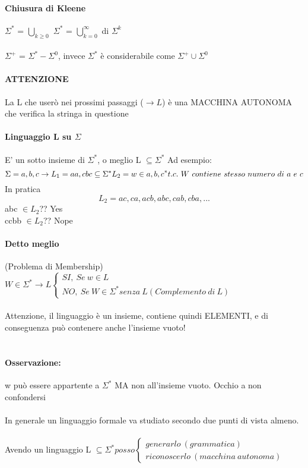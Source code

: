 \documentclass[12pt, a4paper, openany, oneside]{book}
\begin{document}
\paragraph{Chiusura di Kleene}
$\Sigma ^{*}$ = $\bigcup \limits_{k \geq 0}$ $\Sigma ^{*}$ = $\bigcup \limits_{k = 0}^{\infty}$
di $\Sigma ^{k}$
\\ \\
$\Sigma ^{+}$ = $\Sigma ^{*} - \Sigma ^{0}$, invece $\Sigma ^{*}$ è considerabile
come $\Sigma ^{+} \cup \Sigma ^{0}$
\paragraph{ATTENZIONE} La L che userò nei prossimi passaggi ($\to L$) è una MACCHINA 
AUTONOMA che verifica la stringa in questione
\paragraph{Linguaggio L su $\Sigma$}
E' un sotto insieme di $\Sigma ^{*}$, o meglio L  $\subseteq \Sigma ^{*}$ 
Ad esempio:
\[\Sigma = {a, b, c} \to L_{1}={aa, cbc}  \subseteq \Sigma ^{*} \\
L_{2} = {w \in {a,b,c}^{*} t.c. ~ W ~ contiene ~ stesso ~ numero~di~a~e~c} \]
In pratica
\[L_{2} = {ac, ca, acb, abc, cab, cba, ...}\]
abc $\in L_{2}$?? Yes\\
ccbb $\in L_{2}$?? Nope\\
\paragraph{Detto meglio} (Problema di Membership) \\ $W \in \Sigma ^{*} \to L 
\begin{cases}
SI, ~ Se ~ w \in L \\
NO, ~ Se ~ W \in \Sigma ^{*} senza ~ L (Complemento~di~L)
\end{cases}$ \\ \\
Attenzione, il linguaggio è un insieme, contiene quindi ELEMENTI, e di 
conseguenza può contenere anche l'insieme vuoto! \\ \\
\paragraph{Osservazione:} w può essere appartente a $\Sigma ^{*}$ MA non 
all'insieme vuoto. Occhio a non confondersi
\\ \\
In generale un linguaggio formale va studiato secondo due punti di vista almeno.
\\ \\
Avendo un linguaggio L  $\subseteq \Sigma ^{*} posso 
\begin{cases}
generarlo ~(grammatica)\\
riconoscerlo ~(macchina~autonoma)
\end{cases}$
\end{document}
